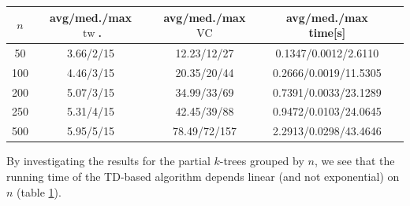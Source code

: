\documentclass[11pt,a4paper]{article}
\DeclareMathOperator{\tw}{tw}
\DeclareMathOperator{\VC}{VC}
\begin{document}
\begin{center}
\begin{table}[h!]
\centering
\begin{tabular}{|c|c|c|c|c|}
\hline
$n$ & avg/med./max $\tw$. & avg/med./max $\VC$ & avg/med./max time[s] \\
\hline \hline
50 & 3.66/2/15 & 12.23/12/27 & 0.1347/0.0012/2.6110 \\
\hline
100 & 4.46/3/15 & 20.35/20/44 & 0.2666/0.0019/11.5305 \\
\hline
200 & 5.07/3/15 & 34.99/33/69 & 0.7391/0.0033/23.1289 \\
\hline
250 & 5.31/4/15 & 42.45/39/88 & 0.9472/0.0103/24.0645 \\
\hline
500 & 5.95/5/15 & 78.49/72/157 & 2.2913/0.0298/43.4646 \\
\hline
\end{tabular}
\label{results_ktrees_n}
\end{table}
\end{center}

By investigating the results for the partial $k$-trees grouped by $n$, we see that the running time of the TD-based algorithm depends linear (and not exponential) on $n$ (table \ref{results_ktrees_n}).
\end{document}
